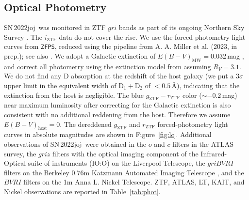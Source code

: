 \documentclass[twocolumn]{aastex631}
\newcommand{\sn}{SN\,2022joj}
\begin{document}
\begin{CJK*}{UTF8}{gbsn}


\subsection{Optical Photometry}
\sn\ was monitored in ZTF $gri$ bands as part of its ongoing Northern Sky Survey \citep{Bellm_ZTF_2019b}. The $i_\mathrm{ZTF}$ data do not cover the rise. We use the forced-photometry light curves from \texttt{ZFPS}, reduced using the pipeline from A. A. Miller et al. (2023, in prep.); see also \citet{Yao_2019}. We adopt a Galactic extinction of ${E(B-V)_\mathrm{MW}}=0.032$\,mag \citep{Schlafly2011}, and correct all photometry using the extinction model from \citet{Fitzpatrick1999} assuming $R_V=3.1$. We do not find any  D absorption at the redshift of the host galaxy (we put a 3$\sigma$ upper limit in the equivalent width of  $\mathrm{D_1}+\mathrm{D_2}$ of $<$$0.5$\,\r{A}), indicating that the extinction from the host is negligible. The blue $g_\mathrm{ZTF}-r_\mathrm{ZTF}$ color ($\sim$$-0.2$\,mag) near maximum luminosity after correcting for the Galactic extinction is also consistent with no additional reddening from the host. Therefore we assume ${E(B-V)}_\mathrm{host}=0$. The dereddened $g_\mathrm{ZTF}$ and $r_\mathrm{ZTF}$ forced-photometry light curves in absolute magnitudes are shown in Figure~\ref{fig:lc}. 
Additional observations of \sn\ were obtained in the $o$ and $c$ filters in the ATLAS survey, the $griz$ filters with the optical imaging component of the Infrared-Optical suite of instruments (IO:O) on the Liverpool Telescope, the $griBVRI$ filters on the Berkeley 0.76m Katzmann Automated Imaging Telescope \citep[KAIT;][]{KAIT_2001}, and the $BVRI$ filters on the 1m Anna L. Nickel Telescope. ZTF, ATLAS, LT, KAIT, and Nickel observations are reported in Table~\ref{tab:phot}. %


\end{CJK*}
\end{document}
